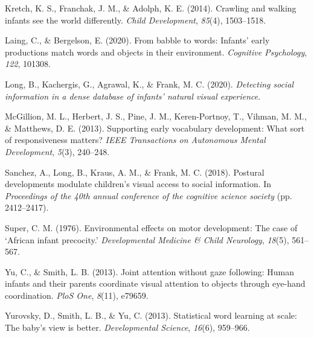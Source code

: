\documentclass[10pt, letterpaper]{article}
\newenvironment{CSLReferences}%
  {}%
  {\par}
\begin{document}
\begin{CSLReferences}{1}{0}
\leavevmode\hypertarget{ref-kretch2014crawling}{}%
Kretch, K. S., Franchak, J. M., \& Adolph, K. E. (2014). Crawling and
walking infants see the world differently. \emph{Child Development},
\emph{85}(4), 1503--1518.

\leavevmode\hypertarget{ref-laing2020babble}{}%
Laing, C., \& Bergelson, E. (2020). From babble to words: Infants' early
productions match words and objects in their environment.
\emph{Cognitive Psychology}, \emph{122}, 101308.

\leavevmode\hypertarget{ref-long2020detecting}{}%
Long, B., Kachergis, G., Agrawal, K., \& Frank, M. C. (2020).
\emph{Detecting social information in a dense database of infants'
natural visual experience}.

\leavevmode\hypertarget{ref-mcgillion2013supporting}{}%
McGillion, M. L., Herbert, J. S., Pine, J. M., Keren-Portnoy, T.,
Vihman, M. M., \& Matthews, D. E. (2013). Supporting early vocabulary
development: What sort of responsiveness matters? \emph{IEEE
Transactions on Autonomous Mental Development}, \emph{5}(3), 240--248.

\leavevmode\hypertarget{ref-sanchez2018detecting}{}%
Sanchez, A., Long, B., Kraus, A. M., \& Frank, M. C. (2018). Postural
developments modulate children's visual access to social information. In
\emph{Proceedings of the 40th annual conference of the cognitive science
society} (pp. 2412--2417).

\leavevmode\hypertarget{ref-super1976environmental}{}%
Super, C. M. (1976). Environmental effects on motor development: The
case of {`{A}frican infant precocity.'} \emph{Developmental Medicine \&
Child Neurology}, \emph{18}(5), 561--567.

\leavevmode\hypertarget{ref-yu2013joint}{}%
Yu, C., \& Smith, L. B. (2013). Joint attention without gaze following:
Human infants and their parents coordinate visual attention to objects
through eye-hand coordination. \emph{PloS One}, \emph{8}(11), e79659.

\leavevmode\hypertarget{ref-yurovsky2013statistical}{}%
Yurovsky, D., Smith, L. B., \& Yu, C. (2013). Statistical word learning
at scale: The baby's view is better. \emph{Developmental Science},
\emph{16}(6), 959--966.

\end{CSLReferences}


\end{document}
